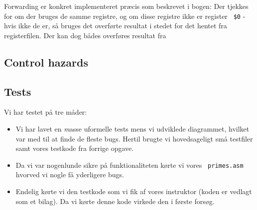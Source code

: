 Forwarding er konkret implementeret præcis som beskrevet i bogen: Der tjekkes
for om der bruges de samme registre, og om disse registre ikke er register {\tt
\$0} - hvis ikke de er, så bruges det overførte resultat i stedet for det hentet
fra registerfilen. Der kan dog bådes overføres resultat fra 

\subsection{Control hazards}

\subsection{Tests}
Vi har testet på tre måder:
\begin{itemize}
\item Vi har lavet en {\emph masse} uformelle tests mens vi udviklede
diagrammet, hvilket var med til at finde de fleste bugs. Hertil brugte vi
hovedsageligt små testfiler samt vores testkode fra forrige opgave.
\item Da vi var nogenlunde sikre på funktionaliteten kørte vi vores {\tt
primes.asm} hvorved vi nogle få yderligere bugs.
\item Endelig kørte vi den testkode som vi fik af vores instruktor (koden er
vedlagt som et bilag). Da vi kørte denne kode virkede den i første forsøg.
\end{itemize}
